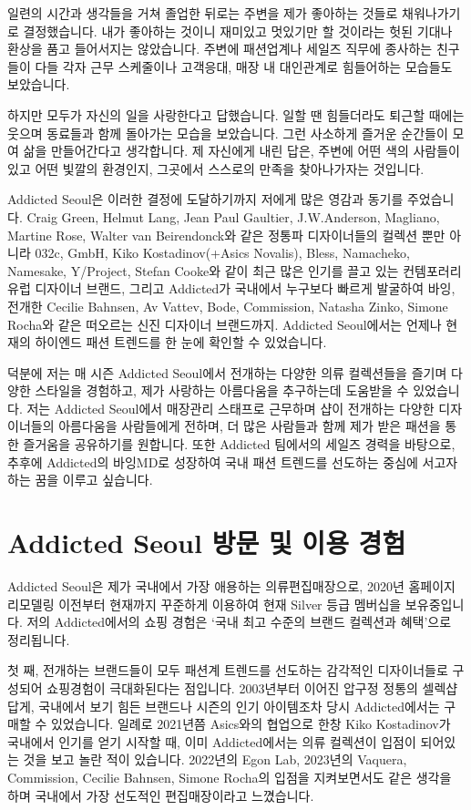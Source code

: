 일련의 시간과 생각들을 거쳐 졸업한 뒤로는 주변을 제가 좋아하는 것들로 채워나가기로 결정했습니다. 내가 좋아하는 것이니 재미있고 멋있기만 할 것이라는 헛된 기대나 환상을 품고 들어서지는 않았습니다. 주변에 패션업계나 세일즈 직무에 종사하는 친구들이 다들 각자 근무 스케줄이나 고객응대, 매장 내 대인관계로 힘들어하는 모습들도 보았습니다.

하지만 모두가 자신의 일을 사랑한다고 답했습니다. 일할 땐 힘들더라도 퇴근할 때에는 웃으며 동료들과 함께 돌아가는 모습을 보았습니다. 그런 사소하게 즐거운 순간들이 모여 삶을 만들어간다고 생각합니다. 제 자신에게 내린 답은, 주변에 어떤 색의 사람들이 있고 어떤 빛깔의 환경인지, 그곳에서 스스로의 만족을 찾아나가자는 것입니다.

Addicted Seoul은 이러한 결정에 도달하기까지 저에게 많은 영감과 동기를 주었습니다. Craig Green, Helmut Lang, Jean Paul Gaultier, J.W.Anderson, Magliano, Martine Rose, Walter van Beirendonck와 같은 정통파 디자이너들의 컬렉션 뿐만 아니라 032c, GmbH, Kiko Kostadinov(+Asics Novalis), Bless, Namacheko, Namesake, Y/Project, Stefan Cooke와 같이 최근 많은 인기를 끌고 있는 컨템포러리 유럽 디자이너 브랜드, 그리고 Addicted가 국내에서 누구보다 빠르게 발굴하여 바잉, 전개한 Cecilie Bahnsen, Av Vattev, Bode, Commission, Natasha Zinko, Simone Rocha와 같은 떠오르는 신진 디자이너 브랜드까지. Addicted Seoul에서는 언제나 현재의 하이엔드 패션 트렌드를 한 눈에 확인할 수 있었습니다.

덕분에 저는 매 시즌 Addicted Seoul에서 전개하는 다양한 의류 컬렉션들을 즐기며 다양한 스타일을 경험하고, 제가 사랑하는 아름다움을 추구하는데 도움받을 수 있었습니다. 저는 Addicted Seoul에서 매장관리 스태프로 근무하며 샵이 전개하는 다양한 디자이너들의 아름다움을 사람들에게 전하며, 더 많은 사람들과 함께 제가 받은 패션을 통한 즐거움을 공유하기를 원합니다. 또한 Addicted 팀에서의 세일즈 경력을 바탕으로, 추후에 Addicted의 바잉MD로 성장하여 국내 패션 트렌드를 선도하는 중심에 서고자 하는 꿈을 이루고 싶습니다.

\section*{Addicted Seoul 방문 및 이용 경험}
Addicted Seoul은 제가 국내에서 가장 애용하는 의류편집매장으로, 2020년 홈페이지 리모델링 이전부터 현재까지 꾸준하게 이용하여 현재 Silver 등급 멤버십을 보유중입니다. 저의 Addicted에서의 쇼핑 경험은 `국내 최고 수준의 브랜드 컬렉션과 혜택'으로 정리됩니다.

첫 째, 전개하는 브랜드들이 모두 패션계 트렌드를 선도하는 감각적인 디자이너들로 구성되어 쇼핑경험이 극대화된다는 점입니다. 2003년부터 이어진 압구정 정통의 셀렉샵답게, 국내에서 보기 힘든 브랜드나 시즌의 인기 아이템조차 당시 Addicted에서는 구매할 수 있었습니다. 일례로 2021년쯤 Asics와의 협업으로 한창 Kiko Kostadinov가 국내에서 인기를 얻기 시작할 때, 이미 Addicted에서는 의류 컬렉션이 입점이 되어있는 것을 보고 놀란 적이 있습니다. 2022년의 Egon Lab, 2023년의 Vaquera, Commission, Cecilie Bahnsen, Simone Rocha의 입점을 지켜보면서도 같은 생각을 하며 국내에서 가장 선도적인 편집매장이라고 느꼈습니다.

